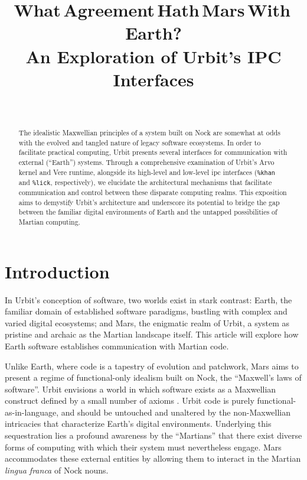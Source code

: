 \documentclass[twoside]{article}
\title{What\,Agreement\,Hath\,Mars\,With\,Earth? \\ An Exploration of Urbit's IPC Interfaces}
\author{~\authorpatp \\ \affiliation}
\date{}
\begin{document}
\maketitle
\thispagestyle{firststyle}

\begin{abstract}
\noindent \sloppy
The idealistic Maxwellian principles of a system built on Nock are somewhat at odds with the evolved and tangled nature of legacy software ecosystems.  In order to facilitate practical computing, Urbit presents several interfaces for communication with external (“Earth”) systems.  Through a comprehensive examination of Urbit's Arvo kernel and Vere runtime, alongside its high-level and low-level {\sc ipc} interfaces (\texttt{\%khan} and \texttt{\%lick}, respectively), we elucidate the architectural mechanisms that facilitate communication and control between these disparate computing realms.  This exposition aims to demystify Urbit's architecture and underscore its potential to bridge the gap between the familiar digital environments of Earth and the untapped possibilities of Martian computing.
\end{abstract}

\setcounter{page}{1}

\tableofcontents

\section{Introduction}

In Urbit's conception of software, two worlds exist in stark contrast:  Earth, the familiar domain of established software paradigms, bustling with complex and varied digital ecosystems; 
and Mars, the enigmatic realm of Urbit, a system as pristine and archaic as the Martian landscape itself.  This article will explore how Earth software establishes communication with Martian code.

\sloppy
Unlike Earth, where code is a tapestry of evolution and patchwork, Mars aims to present a regime of functional-only idealism built on Nock, the ``Maxwell's laws of software''.  Urbit envisions a world in which software exists as a Maxwellian construct defined by a small number of axioms \citep{Nock4K}.  Urbit code is purely functional-as-in-language, and should be untouched and unaltered by the non-Maxwellian intricacies that characterize Earth’s digital environments.  Underlying this sequestration lies a profound awareness by the ``Martians'' that there exist diverse forms of computing with which their system must nevertheless engage.  Mars accommodates these external entities by allowing them to interact in the Martian \emph{lingua franca} of Nock nouns.
\end{document}
